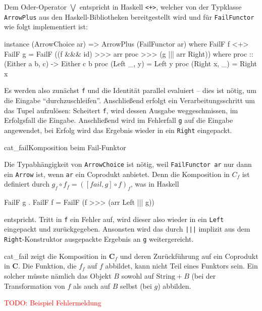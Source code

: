 \documentclass[12pt, a4paper, bibgerm]{scrbook}
\newenvironment{DIFnomarkup}{}{}
\newcommand\icode[1]{\lstinline?#1?}
\newcommand{\todo}[1]{
  \textcolor{red}{TODO: #1}
}
\newcommand\abb{}
\newcommand\fig{}
\begin{document}
Dem Oder-Operator $\bigvee$ entspricht in Haskell \icode{<+>}, welcher
von der Typklasse \icode{ArrowPlus} aus den Haskell-Bibliotheken
bereitgestellt wird und für \icode{FailFunctor} wie folgt implementiert
ist:

\begin{DIFnomarkup}\begin{code}
instance (ArrowChoice ar) => ArrowPlus (FailFunctor ar) where
  FailF f <+> FailF g = FailF ((f &&& id) >>> arr proc >>> (g ||| arr Right))
   where proc :: (Either a b, c) -> Either c b
         proc (Left  _, y) = Left y
         proc (Right x, _) = Right x
\end{code}\end{DIFnomarkup} %

Es werden also zunächst \icode{f} und die Identität parallel evaluiert --
dies ist nötig, um die Eingabe "`durchzuschleifen"'. Anschließend
erfolgt ein Verarbeitungsschritt um das Tupel aufzulösen: Scheitert
\icode{f}, wird dessen Ausgabe weggeschmissen, im Erfolgsfall die
Eingabe. Anschließend wird im Fehlerfall \icode{g} auf die Eingabe
angewendet, bei Erfolg wird das Ergebnis wieder in ein \icode{Right} eingepackt.

\fig{cat_fail}{Komposition beim Fail-Funktor}

Die Typabhängigkeit von \icode{ArrowChoice} ist nötig, weil
\icode{FailFunctor ar} nur dann ein \icode{Arrow} ist, wenn \icode{ar}
ein Coprodukt anbietet. Denn die Komposition in $C_{f}$ ist definiert
durch $g_{f} \circ f_{f} = ([fail,g] \circ f)_{f}$, was in Haskell
\begin{DIFnomarkup}\begin{code}
FailF g . FailF f = FailF (f >>> (arr Left ||| g))
\end{code}\end{DIFnomarkup} %
entspricht. Tritt in \icode{f} ein Fehler auf, wird dieser also wieder
in ein \icode{Left} eingepackt und zurückgegeben. Ansonsten wird das
durch \icode{|||} implizit aus dem \icode{Right}-Konstruktor ausgepackte
Ergebnis an \icode{g} weitergereicht.

\abb{cat_fail} zeigt die Komposition in $\mathbf{C}_f$ und deren
Zurückführung auf ein Coprodukt in $\mathbf{C}$. Die Funktion, die $f_f$
auf $f$ abbildet, kann nicht Teil eines Funktors sein. Ein solcher
müsste nämlich das Objekt $B$ sowohl auf $\mathrm{String}+B$ (bei der
Transformation von $f$ als auch auf $B$ selbst (bei $g$) abbilden.

\todo{Beispiel Fehlermeldung}
\end{document}
